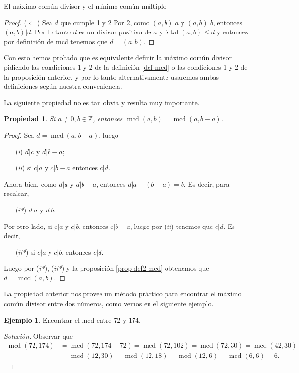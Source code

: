 \documentclass[11pt,spanish,makeidx]{amsbook}
\newtheorem{propiedad}[teorema]{Propiedad}
\theoremstyle{definition}
\newtheorem{ejemplo}{Ejemplo}[section]
\theoremstyle{remark}
\newcommand \mcd{\operatorname{mcd}}
\begin{document}
\begin{section}{El máximo común divisor y el mínimo común múltiplo}
\begin{proof}
	($\Leftarrow$) Sea $d$ que cumple 1 y 2 Por 2, como $(a,b)|a$ y $(a,b)|b$,  entonces $(a,b)|d$. Por  lo tanto $d$ es un divisor positivo de $a$ y $b$ tal  $(a,b) \le d$ y entonces por  definición de mcd tenemos que $d = (a,b)$.
\end{proof}

Con esto  hemos probado que es equivalente definir la máximo común divisor pidiendo  las condiciones 1 y 2 de la definición \ref{def-mcd} o las condiciones 1 y 2 de la proposición anterior, y por  lo tanto alternativamente usaremos ambas definiciones según nuestra conveniencia. 

La siguiente propiedad no es tan obvia y resulta muy importante. 
 
\begin{propiedad}\label{propiedad1}
Si $a \not=0, b \in \mathbb Z$, entonces $\mcd(a,b) = \mcd(a,b-a)$. 
\end{propiedad}
\begin{proof}
Sea $d =  \mcd(a,b-a)$, luego 
\begin{enumerate}
\item[({\em i})] $ d|a$ y $d|b -a$;
\item[({\em ii})] si $ c|a $ y $c|b -a$ entonces $ c|d$.
\end{enumerate}
Ahora bien, como  $ d|a$ y $d|b -a$, entonces $  d|a +(b -a) = b$. Es decir, para recalcar,
\begin{enumerate}
	\item[({\em i*})] $ d|a$ y $d|b$.
\end{enumerate}
Por otro lado, si  $ c|a $ y $c|b$, entonces  $c|b -a$, luego por ({\em ii}) tenemos que $c|d$. Es decir, 
\begin{enumerate}
	\item[({\em ii*})] si  $ c|a $ y $c|b$, entonces  $c|d$.
\end{enumerate}
 Luego por ({\em i*}), ({\em ii*}) y la proposición \ref{prop-def2-mcd} obtenemos que $d = \mcd(a,b)$.
\end{proof}

La propiedad anterior nos provee un método práctico para encontrar el máximo común divisor entre dos números, como vemos en el siguiente ejemplo.

\begin{ejemplo} Encontrar el mcd entre 72 y 174.
\begin{proof}[Solución] Observar que 
\begin{align*}
\mcd(72, 174) &= \mcd(72,174-72) = \mcd(72,102) = \mcd(72,30) =  \mcd(42, 30) \\&= \mcd(12,30) = \mcd(12,18)= \mcd(12,6)= \mcd(6,6) = 6.  
\end{align*}
\end{proof}
\end{ejemplo} 


\end{section}
\end{document}

